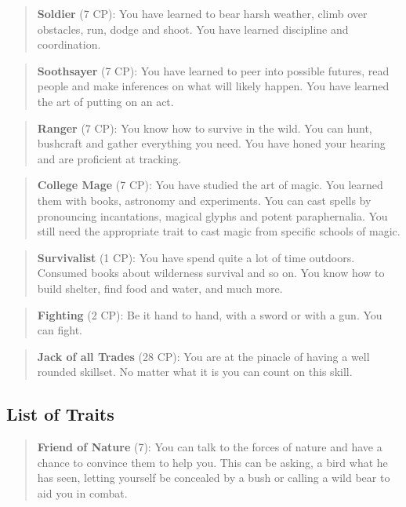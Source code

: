 \documentclass[11pt]{article}
\begin{document}
{\begin{multicols}{2}[]
\begin{quote}
\textbf{Soldier} (7 CP): You have learned to bear harsh weather, climb over obstacles, run, dodge and shoot. You have learned discipline and coordination.
\end{quote}

\begin{quote}
\textbf{Soothsayer} (7 CP): You have learned to peer into possible futures, read people and make inferences on what will likely happen. You have learned the art of putting on an act. 
\end{quote}

\begin{quote}
\textbf{Ranger} (7 CP): You know how to survive in the wild. You can hunt, bushcraft and gather everything you need. You have honed your hearing and are proficient at tracking.
\end{quote}

\begin{quote}
\textbf{College Mage} (7 CP): You have studied the art of magic. You learned them with books, astronomy and experiments. You can cast spells by pronouncing incantations, magical glyphs and potent paraphernalia. You still need the appropriate trait to cast magic from specific schools of magic.
\end{quote}

\begin{quote}
\textbf{Survivalist} (1 CP): You have spend quite a lot of time outdoors. Consumed books about wilderness survival and so on. You know how to build shelter, find food and water, and much more. 
\end{quote}

\begin{quote}
\textbf{Fighting} (2 CP): Be it hand to hand, with a sword or with a gun. You can fight.
\end{quote}

\begin{quote}
\textbf{Jack of all Trades} (28 CP): You are at the pinacle of having a well rounded skillset. No matter what it is you can count on this skill.
\end{quote}



\subsection{List of Traits}
\label{sec:org4b98773}
\begin{quote}
\textbf{Friend of Nature} (7): You can talk to the forces of nature and have a chance to convince them to help you. This can be asking, a bird what he has seen, letting yourself be concealed by a bush or calling a wild bear to aid you in combat.
\end{quote}


\end{multicols}}
\end{document}
